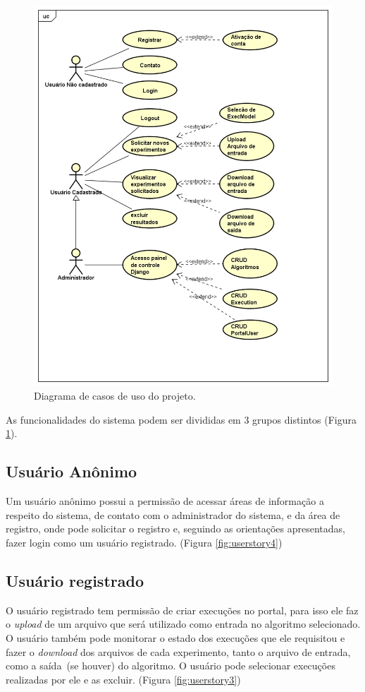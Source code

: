 \documentclass[tg]{mdtufsm}
\begin{document}
\begin{figure}
	\centering
	\includegraphics[width=1\textwidth]{UseCase_tg}
	\caption{
		Diagrama de casos de uso do projeto.
	}
	\label{fig:usecase}
\end{figure}

As funcionalidades do sistema podem ser divididas em 3 grupos distintos (Figura \ref{fig:usecase}).
\subsection{Usuário Anônimo}
Um usuário anônimo possui a permissão de acessar áreas de informação a respeito do sistema, de contato com o administrador do sistema, e da área de registro, onde pode solicitar o registro e, seguindo as orientações apresentadas, fazer login como um usuário registrado. (Figura \ref{fig:userstory4})
\subsection{Usuário registrado}
O usuário registrado tem permissão de criar execuções no portal, para isso ele faz o \emph{upload} de um arquivo que será utilizado como entrada no algoritmo selecionado. O usuário também pode monitorar o estado dos execuções que ele requisitou e fazer o \emph{download} dos arquivos de cada experimento, tanto o arquivo de entrada, como a saída~(se houver) do algoritmo. O usuário pode selecionar execuções realizadas por ele e as excluir. (Figura \ref{fig:userstory3})
\end{document}

